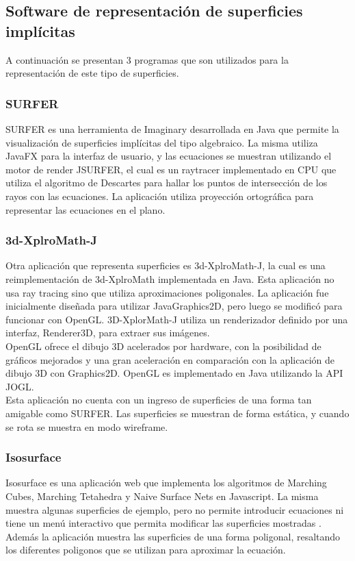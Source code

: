 \documentclass[12pt]{article}
\begin{document}
\subsection{Software de representación de superficies implícitas}
A continuación se presentan 3 programas que son utilizados para la representación de este tipo de superficies.
\subsubsection{SURFER}
SURFER es una herramienta de Imaginary desarrollada en Java que permite la visualización de superficies implícitas del tipo algebraico. La misma utiliza JavaFX para la interfaz de usuario, y las ecuaciones se muestran utilizando el motor de render JSURFER, el cual es un raytracer implementado en CPU que utiliza el algoritmo de Descartes para hallar los puntos de intersección de los rayos con las ecuaciones. La aplicación utiliza proyección ortográfica para representar las ecuaciones en el plano.
\subsubsection{3d-XplroMath-J}
Otra aplicación que representa superficies es 3d-XplroMath-J, la cual es una reimplementación de 3d-XplroMath implementada en Java. Esta aplicación no usa ray tracing sino que utiliza aproximaciones poligonales. La aplicación fue inicialmente diseñada para utilizar JavaGraphics2D, pero luego se modificó para funcionar con OpenGL. 3D-XplorMath-J utiliza un  renderizador definido por una interfaz, Renderer3D, para extraer sus imágenes. 
\\OpenGL ofrece el dibujo 3D acelerados por hardware, con la posibilidad de gráficos mejorados y una gran aceleración en comparación con la aplicación de dibujo 3D con Graphics2D. OpenGL es implementado en Java utilizando la API JOGL.
\\Esta aplicación no cuenta con un ingreso de superficies de una forma tan amigable como SURFER. Las superficies se muestran de forma estática, y cuando se rota se muestra en modo wireframe.
\subsubsection{Isosurface}
Isosurface es una aplicación web que implementa los algoritmos de Marching Cubes, Marching Tetahedra y Naive Surface Nets en Javascript. La misma muestra algunas superficies de ejemplo, pero no permite introducir ecuaciones ni tiene un menú interactivo que permita modificar las superficies mostradas . Además la aplicación muestra las superficies de una forma poligonal, resaltando los diferentes poligonos que se utilizan para aproximar la ecuación.  
\end{document}
